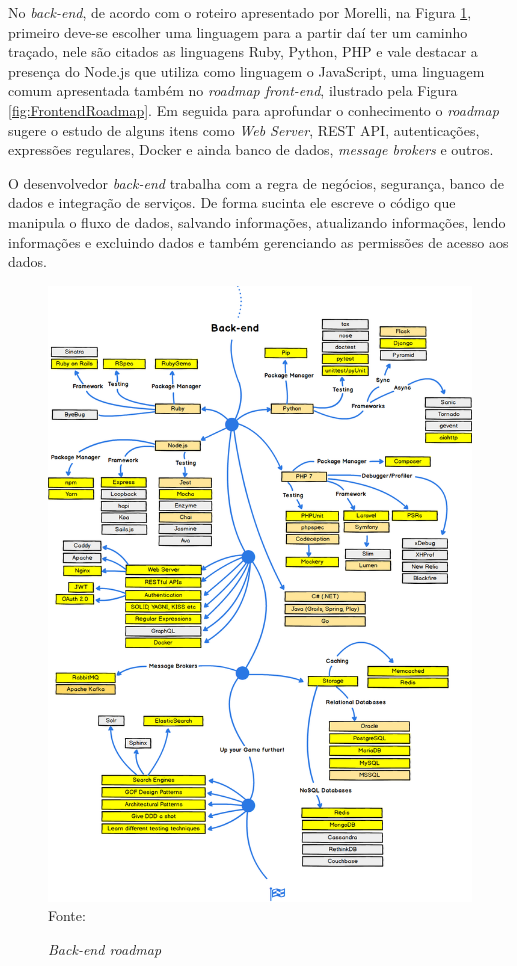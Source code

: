 \documentclass[
	12pt,				%
	openright,			%
	twoside,			%
	a4paper,			%
	english,			%
	brazil				%
	]{abntex2}
\begin{document}
No \textit{back-end}, de acordo com o roteiro apresentado por Morelli\cite{morelli_roadmap}, na Figura \ref{fig:BackendRoadmap}, primeiro deve-se escolher uma linguagem para a partir daí ter um caminho traçado, nele são citados as linguagens Ruby, Python, PHP e vale destacar a presença do Node.js que utiliza como linguagem o JavaScript, uma linguagem comum apresentada também no \textit{roadmap front-end}, ilustrado pela Figura \ref{fig:FrontendRoadmap}. Em seguida para aprofundar o conhecimento o \textit{roadmap} sugere o estudo de alguns itens como \textit{Web Server}, REST API, autenticações, expressões regulares, Docker e ainda banco de dados, \textit{message brokers} e outros.

O desenvolvedor \textit{back-end} trabalha com a regra de negócios, segurança, banco de dados e integração de serviços. De forma sucinta ele escreve o código que manipula o fluxo de dados, salvando informações, atualizando informações, lendo informações e excluindo dados e também gerenciando as permissões de acesso aos dados. 

\begin{figure}[h!]
	\centering

	\caption{\textit{Back-end roadmap}} \label{fig:BackendRoadmap}
    \includegraphics[scale=0.34]{backend-roadmap} \\
    Fonte: {\cite{morelli_roadmap}}

\end{figure}
\end{document}
